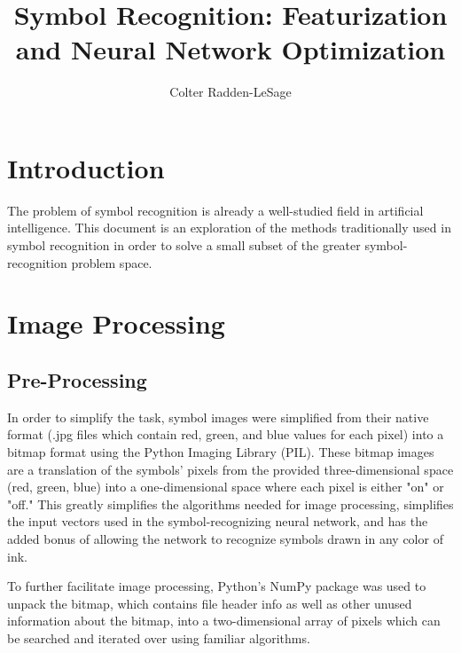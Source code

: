 \documentclass[10pt,a4paper,titlepage]{article}
\author{Colter Radden-LeSage}
\title{Symbol Recognition: Featurization and Neural Network Optimization}
\begin{document}
\maketitle
\section{Introduction}
	The problem of symbol recognition is already a well-studied field in artificial intelligence.  This document is an exploration of the methods traditionally used in symbol recognition in order to solve a small subset of the greater symbol-recognition problem space.

\section{Image Processing}
\subsection{Pre-Processing}
	In order to simplify the task, symbol images were simplified from their native format (.jpg files which contain red, green, and blue values for each pixel) into a bitmap format using the Python Imaging Library (PIL).  These bitmap images are a translation of the symbols' pixels from the provided three-dimensional space (red, green, blue) into a one-dimensional space where each pixel is either "on" or "off."  This greatly simplifies the algorithms needed for image processing, simplifies the input vectors used in the symbol-recognizing neural network, and has the added bonus of allowing the network to recognize symbols drawn in any color of ink.

	To further facilitate image processing, Python's NumPy package was used to unpack the bitmap, which contains file header info as well as other unused information about the bitmap, into a two-dimensional array of pixels which can be searched and iterated over using familiar algorithms.
	
\end{document}
